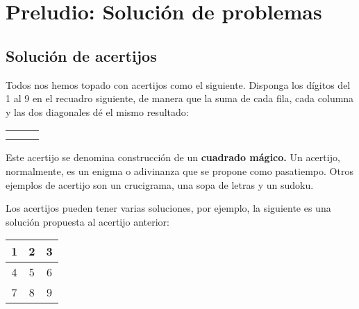 
\chapter{Preludio: Solución de problemas}


\section{Solución de acertijos}


Todos nos hemos topado con acertijos como el siguiente. Disponga los
dígitos del 1 al 9 en el recuadro siguiente, de manera que la suma
de cada fila, cada columna y las dos diagonales dé el mismo resultado:

\begin{center}
\begin{tabular}{|c|c|c|}
\hline 
 &  & \tabularnewline
\hline 
 &  & \tabularnewline
\hline 
 &  & \tabularnewline
\hline 
\end{tabular}
\par\end{center}

Este acertijo se denomina construcción de un \textbf{cuadrado mágico.
}Un acertijo, normalmente, es un enigma o adivinanza que se propone
como pasatiempo. Otros ejemplos de acertijo son un crucigrama, una
sopa de letras y un sudoku.

Los acertijos pueden tener varias soluciones, por ejemplo, la siguiente
es una solución propuesta al acertijo anterior:

\begin{center}
\begin{tabular}{|c|c|c|}
\hline 
1  & 2  & 3\tabularnewline
\hline 
4  & 5  & 6\tabularnewline
\hline 
7  & 8  & 9 \tabularnewline
\hline 
\end{tabular}
\par\end{center}

